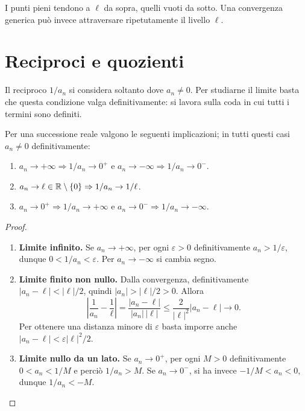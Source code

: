 \begin{schema}
\par\smallskip I punti pieni tendono a $\ell$ da sopra, quelli vuoti da sotto. Una convergenza generica può invece attraversare ripetutamente il livello $\ell$.
\end{schema}

\section{Reciproci e quozienti}

Il reciproco $1/a_n$ si considera soltanto dove $a_n\ne0$. Per studiarne il limite basta che questa condizione valga definitivamente: si lavora sulla coda in cui tutti i termini sono definiti.

\begin{proposizione}
\label{prop:limite-reciproco}
Per una successione reale valgono le seguenti implicazioni; in tutti questi casi $a_n\ne0$ definitivamente:
\begin{enumerate}[label=\arabic*.]
\item $a_n\to+\infty\Rightarrow1/a_n\to0^+$ e $a_n\to-\infty\Rightarrow1/a_n\to0^-$.
\item $a_n\to\ell\in\mathbb{R}\setminus\{0\}\Rightarrow1/a_n\to1/\ell$.
\item $a_n\to0^+\Rightarrow1/a_n\to+\infty$ e $a_n\to0^-\Rightarrow1/a_n\to-\infty$.
\end{enumerate}
\end{proposizione}
\begin{proof}
\begin{enumerate}[label=\arabic*.]
\item \textbf{Limite infinito.} Se $a_n\to+\infty$, per ogni $\varepsilon>0$ definitivamente $a_n>1/\varepsilon$, dunque $0<1/a_n<\varepsilon$. Per $a_n\to-\infty$ si cambia segno.
\item \textbf{Limite finito non nullo.} Dalla convergenza, definitivamente $|a_n-\ell|<|\ell|/2$, quindi $|a_n|>|\ell|/2>0$. Allora
\[
\left|\frac1{a_n}-\frac1\ell\right|
=\frac{|a_n-\ell|}{|a_n|\,|\ell|}
\le\frac{2}{|\ell|^2}|a_n-\ell|\longrightarrow0.
\]
Per ottenere una distanza minore di $\varepsilon$ basta imporre anche $|a_n-\ell|<\varepsilon|\ell|^2/2$.
\item \textbf{Limite nullo da un lato.} Se $a_n\to0^+$, per ogni $M>0$ definitivamente $0<a_n<1/M$ e perciò $1/a_n>M$. Se $a_n\to0^-$, si ha invece $-1/M<a_n<0$, dunque $1/a_n<-M$.
\end{enumerate}
\end{proof}

